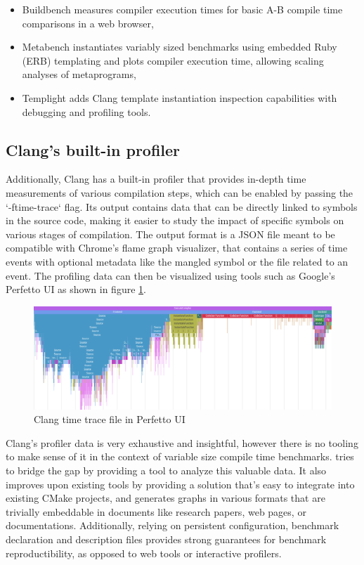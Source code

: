 \documentclass[../../main.tex]{subfiles}
\begin{document}
\begin{itemize}
\item Buildbench\cite{buildbench} measures compiler execution times for basic
      A-B compile time comparisons in a web browser,
\item Metabench\cite{metabench} instantiates variably sized benchmarks using embedded
      Ruby (ERB) templating and plots compiler execution time, allowing scaling
      analyses of metaprograms,
\item Templight\cite{templight} adds Clang template instantiation inspection
      capabilities with debugging and profiling tools.
\end{itemize}

\subsection{Clang's built-in profiler}


Additionally, Clang has a built-in profiler\cite{time-trace} that provides in-depth
time measurements of various compilation steps, which can be enabled by passing
the `-ftime-trace` flag. Its output contains data that can be directly linked to
symbols in the source code, making it easier to study the impact of specific
symbols on various stages of compilation. The output format is a JSON file meant
to be compatible with Chrome's flame graph visualizer, that contains a series of
time events with optional metadata like the mangled \cpp symbol or the file
related to an event. The profiling data can then be visualized using tools such
as Google's Perfetto UI as shown in figure \ref{fig:perfetto-time-trace-ui}.

\begin{figure}[h]
\includegraphics[scale=0.264]{images/perfetto-ui.png}
\caption{Clang time trace file in Perfetto UI}
\label{fig:perfetto-time-trace-ui}
\end{figure}

Clang's profiler data is very exhaustive and insightful, however there is no
tooling to make sense of it in the context of variable size compile time
benchmarks. \ctbench tries to bridge the gap by providing a tool to analyze
this valuable data. It also improves upon existing tools by providing a solution
that's easy to integrate into existing CMake projects, and generates graphs in
various formats that are trivially embeddable in documents like research papers,
web pages, or documentations. Additionally, relying on persistent configuration,
benchmark declaration and description files provides strong guarantees for
benchmark reproductibility, as opposed to web tools or interactive profilers.
\end{document}
